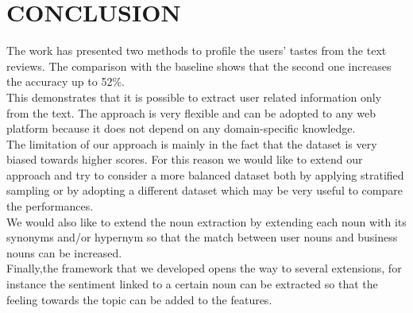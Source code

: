 \documentclass[11pt]{article}
\begin{document}
\section{CONCLUSION}
The work has presented two methods to profile the users' tastes from the text reviews. The comparison with the baseline shows that the second one increases the accuracy up to 52\%.\\
This demonstrates that it is possible to extract user related information only from the text. The approach is very flexible and can be adopted to any web platform because it does not depend on any domain-specific knowledge.\\
The limitation of our approach is mainly in the fact that the dataset is very biased towards higher scores. For this reason we would like to extend our approach and try to consider a more balanced dataset both by applying stratified sampling or by adopting a different dataset which may be very useful to compare the performances.\\
We would also like to extend the noun extraction by extending each noun with its synonyms and/or hypernym so that the match between user nouns and business nouns can be increased.\\
Finally,the framework that we developed opens the way to several extensions, for instance the sentiment linked to a certain noun can be extracted so that the feeling towards the topic can be added to the features.\\


\addtolength{\textheight}{-12cm}   %







\end{document}
